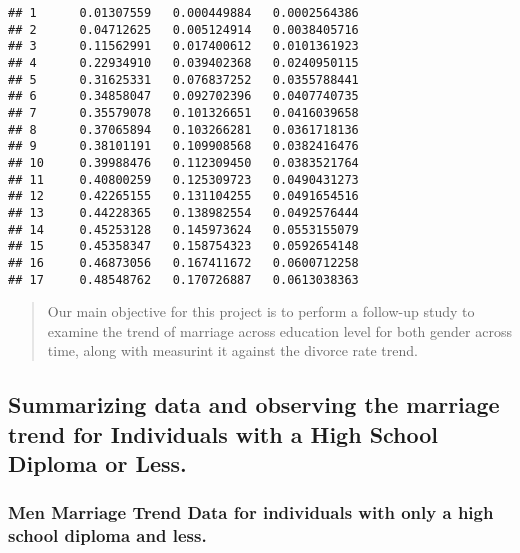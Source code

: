 \documentclass[
]{article}
\begin{document}
\begin{verbatim}
## 1      0.01307559   0.000449884   0.0002564386
## 2      0.04712625   0.005124914   0.0038405716
## 3      0.11562991   0.017400612   0.0101361923
## 4      0.22934910   0.039402368   0.0240950115
## 5      0.31625331   0.076837252   0.0355788441
## 6      0.34858047   0.092702396   0.0407740735
## 7      0.35579078   0.101326651   0.0416039658
## 8      0.37065894   0.103266281   0.0361718136
## 9      0.38101191   0.109908568   0.0382416476
## 10     0.39988476   0.112309450   0.0383521764
## 11     0.40800259   0.125309723   0.0490431273
## 12     0.42265155   0.131104255   0.0491654516
## 13     0.44228365   0.138982554   0.0492576444
## 14     0.45253128   0.145973624   0.0553155079
## 15     0.45358347   0.158754323   0.0592654148
## 16     0.46873056   0.167411672   0.0600712258
## 17     0.48548762   0.170726887   0.0613038363
\end{verbatim}

\begin{quote}
Our main objective for this project is to perform a follow-up study to
examine the trend of marriage across education level for both gender
across time, along with measurint it against the divorce rate trend.
\end{quote}

\hypertarget{summarizing-data-and-observing-the-marriage-trend-for-individuals-with-a-high-school-diploma-or-less.}{%
\subsection{Summarizing data and observing the marriage trend for
Individuals with a High School Diploma or
Less.}\label{summarizing-data-and-observing-the-marriage-trend-for-individuals-with-a-high-school-diploma-or-less.}}

\hypertarget{men-marriage-trend-data-for-individuals-with-only-a-high-school-diploma-and-less.}{%
\subsubsection{Men Marriage Trend Data for individuals with only a high
school diploma and
less.}\label{men-marriage-trend-data-for-individuals-with-only-a-high-school-diploma-and-less.}}
\end{document}
